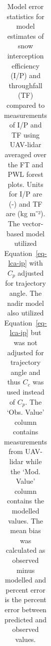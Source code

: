 \documentclass[
  letterpaper,
  DIV=11,
  numbers=noendperiod]{scrartcl}
\begin{document}
\pagebreak

\begin{longtable}[]{@{}
  >{\raggedright\arraybackslash}p{}
  >{\raggedright\arraybackslash}p{}
  >{\raggedright\arraybackslash}p{}
  >{\raggedright\arraybackslash}p{}
  >{\raggedleft\arraybackslash}p{}
  >{\raggedleft\arraybackslash}p{}
  >{\raggedleft\arraybackslash}p{}
  >{\raggedleft\arraybackslash}p{}@{}}

\caption{\label{tbl-vb-plot-err}Model error statistics for model
estimates of snow interception efficiency (I/P) and throughfall (TF)
compared to measurements of I/P and TF using UAV-lidar averaged over the
FT and PWL forest plots. Units for I/P are (-) and TF are (kg m⁻²). The
vector-based model utilized Equation~\ref{eq-lca-ip} with \(C_p\)
adjusted for trajectory angle. The nadir model also utilized
Equation~\ref{eq-lca-ip} but was not adjusted for trajectory angle and
thus \(C_c\) was used instead of \(C_p\). The `Obs. Value' column
contains measurements from UAV-lidar while the `Mod. Value' column
contains the modelled values. The mean bias was calculated as observed
minus modelled and percent error is the percent error between predicted
and observed values.}

\tabularnewline


\end{longtable}
\end{document}
